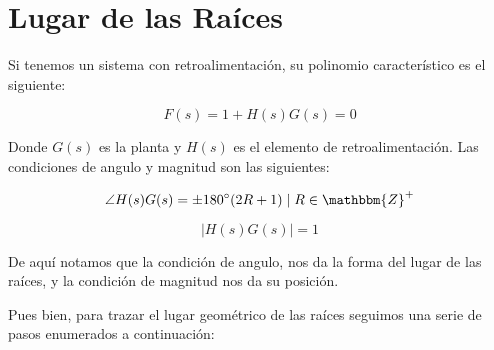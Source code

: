 
\chapter{Lugar de las Raíces}
	Si tenemos un sistema con retroalimentación, su polinomio característico es el siguiente:

	\begin{equation}
		F(s) = 1 + H(s) G(s) = 0
	\end{equation}

	Donde $G(s)$ es la planta y $H(s)$ es el elemento de retroalimentación. Las condiciones de angulo y magnitud son las siguientes:

	\begin{equation}
		\angle H(s) G(s) = \pm 180^{\circ} (2R + 1) \mid R \in \mathbbm{Z}^+
	\end{equation}

	\begin{equation}
		\lvert H(s) G(s) \rvert = 1
	\end{equation}

	De aquí notamos que la condición de angulo, nos da la forma del lugar de las raíces, y la condición de magnitud nos da su posición.

	Pues bien, para trazar el lugar geométrico de las raíces seguimos una serie de pasos enumerados a continuación:

